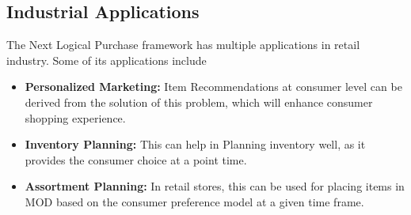 \subsection{Industrial Applications}
The Next Logical Purchase framework has multiple applications in retail industry. Some of its applications 
include
\begin{itemize}
\item {\bf Personalized Marketing:} Item Recommendations at consumer level can be derived from the 
solution of this problem, which will enhance consumer shopping experience.
\item {\bf Inventory Planning:} This can help in Planning inventory well, as it provides the 
consumer choice at a point time.
\item {\bf Assortment Planning:} In retail stores, this can be used for placing items in MOD based on the 
consumer preference model at a given time frame.
\end{itemize}
